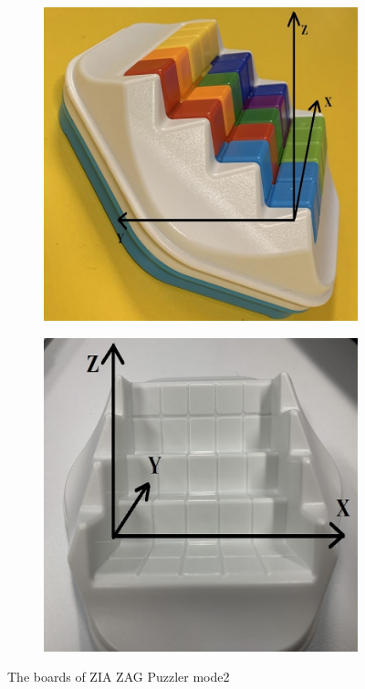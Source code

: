 \begin{figure}[htbp]
\centering
\begin{subfigure}[b]{.3\textwidth}
\centering
\includegraphics[width=\textwidth]{figs/ZIGZAGmodel2board.jpg}
\caption{}
\label{fig:board2A}
\end{subfigure}
\begin{subfigure}[b]{.3\textwidth}
\centering
\includegraphics[width=\textwidth]{figs/3Dboard2.jpg}
\caption{}
\label{fig:board2B}
\end{subfigure}
\caption{The boards of ZIA ZAG Puzzler mode2}
  \label{fig:board2}
\end{figure}

